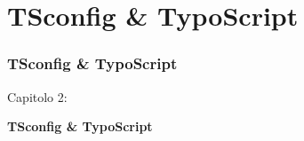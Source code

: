 %

\section{TSconfig \& TypoScript}
\begin{frame}[fragile]
	\frametitle{TSconfig \& TypoScript}

	\begin{center}\huge{Capitolo 2:}\end{center}
	\begin{center}\huge{\color{typo3darkgrey}\textbf{TSconfig \& TypoScript}}\end{center}

\end{frame}

